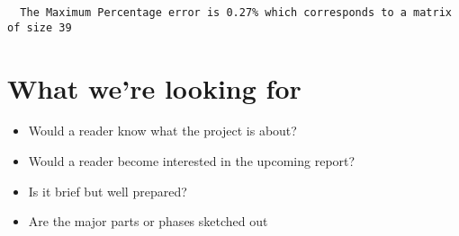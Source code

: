 \documentclass[11pt]{article}
\begin{document}
\begin{verbatim}
  The Maximum Percentage error is 0.27% which corresponds to a matrix of size 39
\end{verbatim}
\section{What we're looking for}
\label{sec:org08b39d7}

\begin{itemize}
\item Would a reader know what the project is about?
\item Would a reader become interested in the upcoming report?
\item Is it brief but well prepared?
\item Are the major parts or phases sketched out
\end{itemize}
\end{document}
